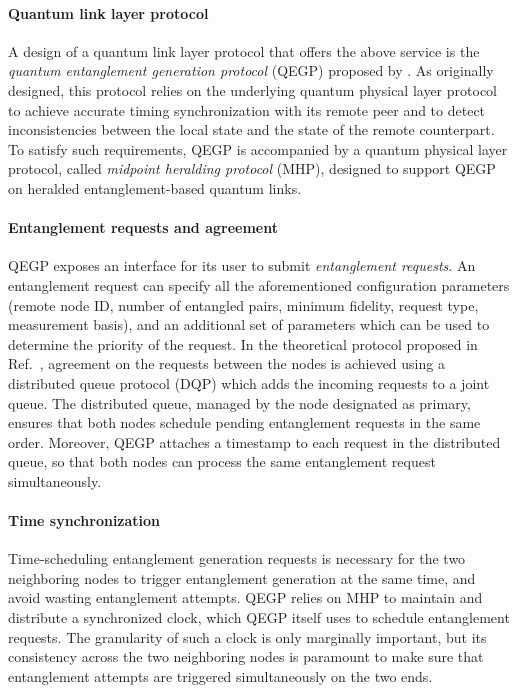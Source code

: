 \paragraph{Quantum link layer protocol}

A design of a quantum link layer protocol that offers the above service is the \emph{quantum
entanglement generation protocol} (QEGP) proposed by \textcite{dahlberg_2019_egp}. As originally
designed, this protocol relies on the underlying quantum physical layer protocol to achieve accurate
timing synchronization with its remote peer and to detect inconsistencies between the local state
and the state of the remote counterpart. To satisfy such requirements, QEGP is accompanied by a
quantum physical layer protocol, called \emph{midpoint heralding protocol} (MHP), designed to
support QEGP on heralded entanglement-based quantum links.

\paragraph{Entanglement requests and agreement}

QEGP exposes an interface for its user to submit \emph{entanglement requests}. An entanglement
request can specify all the aforementioned configuration parameters (remote node ID, number of
entangled pairs, minimum fidelity, request type, measurement basis), and an additional set of
parameters which can be used to determine the priority of the request. In the theoretical protocol
proposed in Ref.~\cite{dahlberg_2019_egp}, agreement on the requests between the nodes is achieved
using a distributed queue protocol (DQP) which adds the incoming requests to a joint queue. The
distributed queue, managed by the node designated as primary, ensures that both nodes schedule
pending entanglement requests in the same order. Moreover, QEGP attaches a timestamp to each request
in the distributed queue, so that both nodes can process the same entanglement request
simultaneously.

\paragraph{Time synchronization}

Time-scheduling entanglement generation requests is necessary for the two neighboring nodes to
trigger entanglement generation at the same time, and avoid wasting entanglement attempts. QEGP
relies on MHP to maintain and distribute a synchronized clock, which QEGP itself uses to schedule
entanglement requests. The granularity of such a clock is only marginally important, but its
consistency across the two neighboring nodes is paramount to make sure that entanglement attempts
are triggered simultaneously on the two ends.

